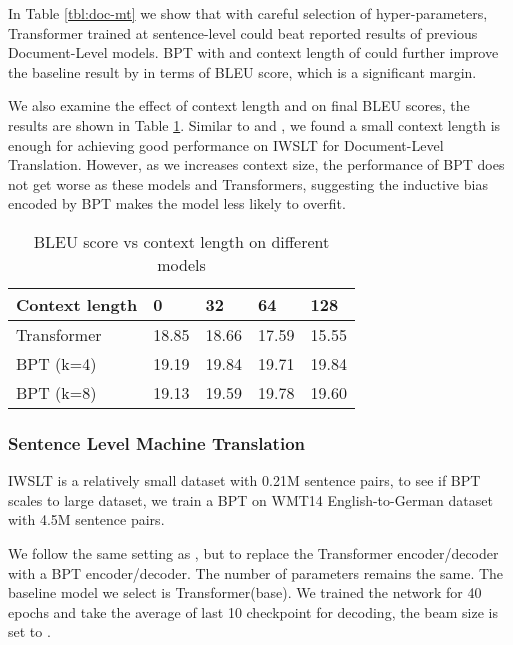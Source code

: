 \documentclass[11pt,a4paper]{article}
\begin{document}
In Table \ref{tbl:doc-mt} we show that with careful selection of hyper-parameters, Transformer trained at sentence-level could beat reported results of previous Document-Level models. BPT with  and context length of  could further improve the baseline result by  in terms of BLEU score, which is a significant margin.

We also examine the effect of context length and  on final BLEU scores, the results are shown in Table \ref{tbl:doc-mt-ctx}.  Similar to  \citet{tu2018learning} and  \citet{miculicich-etal-2018-document}, we found a small context length is enough for achieving good performance on IWSLT for Document-Level Translation. However, as we increases context size, the performance of BPT does not get worse as these models and Transformers, suggesting the inductive bias encoded by BPT makes the model less likely to overfit.

\begin{table}[!htb]
\small
\centering
\begin{tabular}{lllll}
\toprule
Context length & 0     & 32    & 64    & 128   \\
\midrule
Transformer    & 18.85 & 18.66 & 17.59 & 15.55 \\
BPT (k=4)       & 19.19 & 19.84 & 19.71 & 19.84 \\
BPT (k=8)       & 19.13 & 19.59 & 19.78 & 19.60 \\
\bottomrule
\end{tabular}
\caption{BLEU score vs context length on different models}
\label{tbl:doc-mt-ctx}
\end{table}

\subsubsection{Sentence Level Machine Translation}

IWSLT is a relatively small dataset with 0.21M sentence pairs, to see if BPT scales to large dataset, we train a BPT on WMT14 English-to-German dataset with 4.5M sentence pairs.

We follow the same setting as \cite{vaswani2017attention}, but to replace the Transformer encoder/decoder with a BPT encoder/decoder.
The number of parameters remains the same.
The baseline model we select is Transformer(base).
We trained the network for 40 epochs and take the average of last 10 checkpoint for decoding, the beam size is set to .
\end{document}
